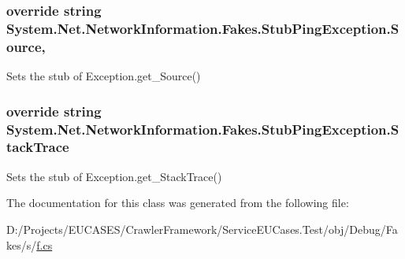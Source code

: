 \hypertarget{class_system_1_1_net_1_1_network_information_1_1_fakes_1_1_stub_ping_exception_ad87f584df6c14b8e5e7e2ac6338cd362}{
\subsubsection[{Source}]{\setlength{\rightskip}{0pt plus 5cm}override string System.\-Net.\-Network\-Information.\-Fakes.\-Stub\-Ping\-Exception.\-Source\hspace{0.3cm}{\ttfamily [get]}, {\ttfamily [set]}}}\label{class_system_1_1_net_1_1_network_information_1_1_fakes_1_1_stub_ping_exception_ad87f584df6c14b8e5e7e2ac6338cd362}


Sets the stub of Exception.\-get\-\_\-\-Source()

\hypertarget{class_system_1_1_net_1_1_network_information_1_1_fakes_1_1_stub_ping_exception_a6ebd71972496b19e4ffd19394cd94cdc}{
\subsubsection[{Stack\-Trace}]{\setlength{\rightskip}{0pt plus 5cm}override string System.\-Net.\-Network\-Information.\-Fakes.\-Stub\-Ping\-Exception.\-Stack\-Trace\hspace{0.3cm}{\ttfamily [get]}}}\label{class_system_1_1_net_1_1_network_information_1_1_fakes_1_1_stub_ping_exception_a6ebd71972496b19e4ffd19394cd94cdc}


Sets the stub of Exception.\-get\-\_\-\-Stack\-Trace()



The documentation for this class was generated from the following file\-:\begin{DoxyCompactItemize}
\item 
D\-:/\-Projects/\-E\-U\-C\-A\-S\-E\-S/\-Crawler\-Framework/\-Service\-E\-U\-Cases.\-Test/obj/\-Debug/\-Fakes/s/\hyperlink{s_2f_8cs}{f.\-cs}\end{DoxyCompactItemize}
